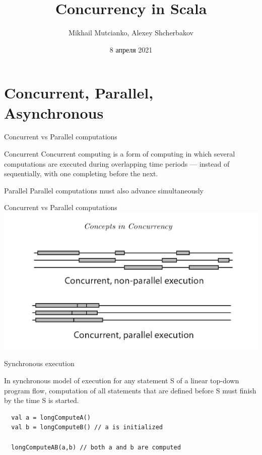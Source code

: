 \documentclass[aspectratio=169]{beamer}
\title{Concurrency in Scala}
\author{Mikhail Mutcianko, Alexey Shcherbakov}
\institute{СПБгУ, СП}
\date{8 апреля 2021}
\begin{document}
\frame{\titlepage}

\section{Concurrent, Parallel, Asynchronous}
\begin{frame}{Concurrent vs Parallel computations}
  \begin{block}{Concurrent}
   Concurrent computing is a form of computing in which several computations are executed
   during overlapping time periods — instead of sequentially, with one completing before
   the next.
  \end{block}

  \begin{block}{Parallel}
    Parallel computations must also advance simultaneously
  \end{block}
\end{frame}

\begin{frame}{Concurrent vs Parallel computations}
  \centering
  \includegraphics[scale=0.55]{cvp.jpg}
\end{frame}

\begin{frame}[fragile]{Synchronous execution}
  \begin{block}{}
    In synchronous model of execution for any statement S of a linear top-down
    program flow, computation of all statements that are defined before S must
    finish by the time S is started.
  \end{block}
  \bigskip
  \pause
  \begin{verbatim}
  val a = longComputeA()
  val b = longComputeB() // a is initialized

  longComputeAB(a,b) // both a and b are computed
  \end{verbatim}
\end{frame}
\end{document}
